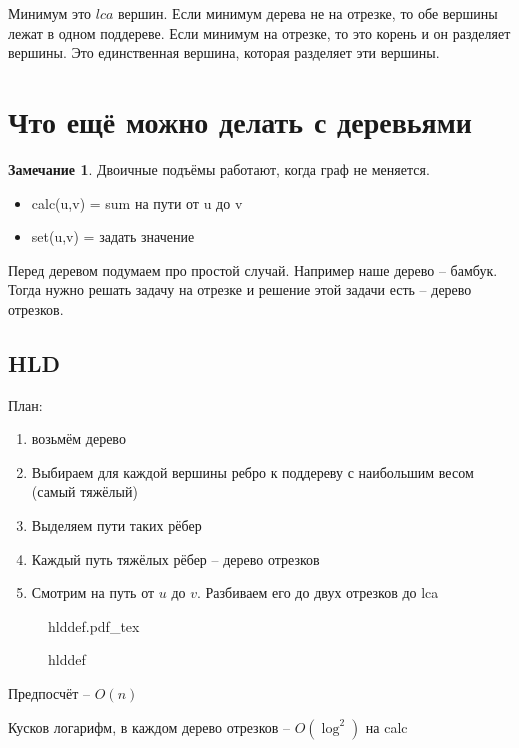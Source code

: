 \documentclass{book}
\theoremstyle{definition}
\newtheorem*{note}{Замечание}
\newcommand{\incfig}[1]{%
    \def\svgwidth{\columnwidth}
    {#1.pdf_tex}
}
\begin{document}
\begin{statement}
    Минимум это $lca$ вершин. Если минимум дерева не на отрезке, то обе вершины лежат в одном поддереве. Если минимум на отрезке, то это корень и он разделяет вершины. Это единственная вершина, которая разделяет эти вершины.
\end{statement}

\section{Что ещё можно делать с деревьями}

\begin{note}
    Двоичные подъёмы работают, когда граф не меняется.
\end{note}

\begin{itemize}
   \item  calc(u,v) = sum на пути от u до v
   \item  set(u,v) = задать значение
\end{itemize}

Перед деревом подумаем про простой случай. Например наше дерево -- бамбук. Тогда нужно решать задачу на отрезке и решение этой задачи есть -- дерево отрезков.

\subsection{HLD}

План:
\begin{enumerate}
    \item возьмём дерево
    \item Выбираем для каждой вершины ребро к поддереву с наибольшим весом (самый тяжёлый)
    \item Выделяем пути таких рёбер
    \item Каждый путь тяжёлых рёбер -- дерево отрезков
    \item Смотрим на путь от $u$ до  $v$. Разбиваем его до двух отрезков до lca
\end{enumerate}

\begin{figure}[!ht]
    \centering
    \incfig{hlddef}
    \caption{hlddef}
    \label{fig:hlddef}
\end{figure}

Предпосчёт -- $O(n)$

Кусков логарифм, в каждом дерево отрезков -- $O(\log ^2)$ на calc
\end{document}
